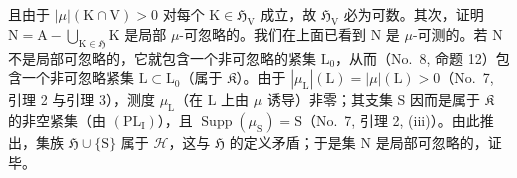 且由于 \(|\mu|(\mathrm{K} \cap \mathrm{V}) > 0\) 对每个 \(\mathrm{K} \in \mathfrak{H}_{\mathrm{V}}\) 成立，故 \(\mathfrak{H}_{\mathrm{V}}\) 必为可数。其次，证明 \(\mathrm{N} = \mathrm{A} - \bigcup_{\mathrm{K} \in \mathfrak{H}} \mathrm{K}\) 是局部 \(\mu\)-可忽略的。我们在上面已看到 \(\mathrm{N}\) 是 \(\mu\)-可测的。若 \(\mathrm{N}\) 不是局部可忽略的，它就包含一个非可忽略的紧集 \(\mathrm{L}_0\)，从而（No.~8, 命题 12）包含一个非可忽略紧集 \(\mathrm{L} \subset \mathrm{L}_0\)（属于 \(\mathfrak{K}\)）。由于 \(|\mu_{\mathrm{L}}|(\mathrm{L}) = |\mu|(\mathrm{L}) > 0\)（No.~7, 引理 2 与引理 3），测度 \(\mu_{\mathrm{L}}\)（在 \(\mathrm{L}\) 上由 \(\mu\) 诱导）非零；其支集 \(\mathrm{S}\) 因而是属于 \(\mathfrak{K}\) 的非空紧集（由 \((\mathrm{PL}_{\mathrm{I}})\)），且 \(\operatorname{Supp}(\mu_{\mathrm{S}}) = \mathrm{S}\)（No.~7, 引理 2, (iii)）。由此推出，集族 \(\mathfrak{H} \cup \{\mathrm{S}\}\) 属于 \(\mathscr{H}\)，这与 \(\mathfrak{H}\) 的定义矛盾；于是集 \(\mathrm{N}\) 是局部可忽略的，证毕。

